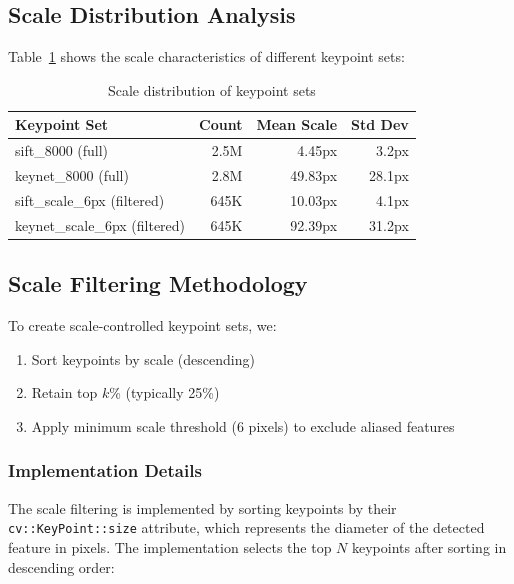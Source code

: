 \subsection{Scale Distribution Analysis}

Table~\ref{tab:scale_distribution} shows the scale characteristics of different keypoint sets:

\begin{table}[ht]
\centering
\caption{Scale distribution of keypoint sets}
\label{tab:scale_distribution}
\begin{tabular}{lrrr}
\toprule
\textbf{Keypoint Set} & \textbf{Count} & \textbf{Mean Scale} & \textbf{Std Dev} \\
\midrule
sift\_8000 (full) & 2.5M & 4.45px & 3.2px \\
keynet\_8000 (full) & 2.8M & 49.83px & 28.1px \\
sift\_scale\_6px (filtered) & 645K & 10.03px & 4.1px \\
keynet\_scale\_6px (filtered) & 645K & 92.39px & 31.2px \\
\bottomrule
\end{tabular}
\end{table}

\subsection{Scale Filtering Methodology}

To create scale-controlled keypoint sets, we:

\begin{enumerate}
    \item Sort keypoints by scale (descending)
    \item Retain top $k$\% (typically 25\%)
    \item Apply minimum scale threshold (6 pixels) to exclude aliased features
\end{enumerate}

\subsubsection{Implementation Details}

The scale filtering is implemented by sorting keypoints by their \texttt{cv::KeyPoint::size} attribute, which represents the diameter of the detected feature in pixels. The implementation selects the top $N$ keypoints after sorting in descending order:


